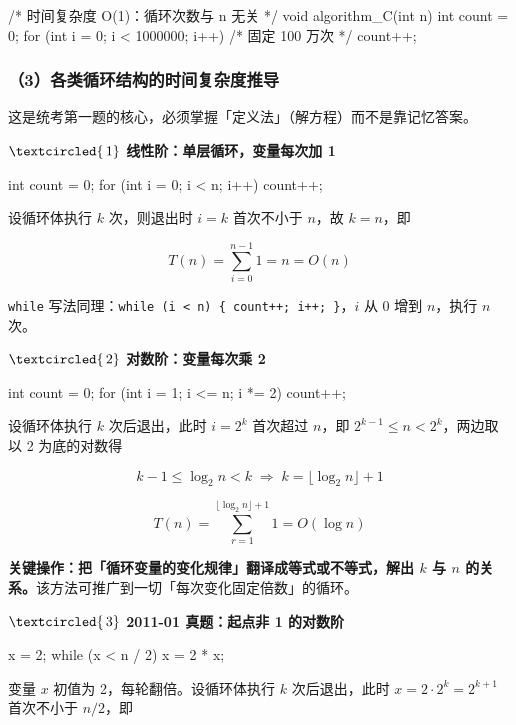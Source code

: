 \documentclass[11pt,openany,UTF8]{ctexbook}
\newcommand{\circled}[1]{\textcircled{\scriptsize\,#1}}
\begin{document}
\begin{codebox}
/* 时间复杂度 O(1)：循环次数与 n 无关 */
void algorithm_C(int n) {
    int count = 0;
    for (int i = 0; i < 1000000; i++)   /* 固定 100 万次 */
        count++;
}
\end{codebox}

\subsubsection{（3）各类循环结构的时间复杂度推导}

这是统考第一题的核心，必须掌握「定义法」（解方程）而不是靠记忆答案。

\textbf{$\circled{1}$ 线性阶：单层循环，变量每次加 1}

\begin{codebox}
int count = 0;
for (int i = 0; i < n; i++)
    count++;
\end{codebox}

设循环体执行 $k$ 次，则退出时 $i = k$ 首次不小于 $n$，故 $k = n$，即

\[T(n) = \sum_{i=0}^{n-1}1 = n = O(n)\]

\texttt{while} 写法同理：\texttt{while (i <\allowbreak{} n)\allowbreak{} \{ count+\allowbreak{}+\allowbreak{};\allowbreak{} i+\allowbreak{}+\allowbreak{};\allowbreak{} \}}，$i$ 从 0 增到 $n$，执行 $n$ 次。

\textbf{$\circled{2}$ 对数阶：变量每次乘 2}

\begin{codebox}
int count = 0;
for (int i = 1; i <= n; i *= 2)
    count++;
\end{codebox}

设循环体执行 $k$ 次后退出，此时 $i = 2^k$ 首次超过 $n$，即 $2^{k-1} \le n < 2^k$，两边取以 2 为底的对数得

\[k-1 \le \log_2 n < k \;\Longrightarrow\; k = \lfloor \log_2 n \rfloor + 1\]

\[T(n)=\sum_{r=1}^{\lfloor \log_2 n\rfloor+1} 1 = O(\log n)\]

\textbf{关键操作：把「循环变量的变化规律」翻译成等式或不等式，解出 $k$ 与 $n$ 的关系。}该方法可推广到一切「每次变化固定倍数」的循环。

\textbf{$\circled{3}$ 2011-01 真题：起点非 1 的对数阶}

\begin{codebox}
x = 2;
while (x < n / 2)
    x = 2 * x;
\end{codebox}

变量 $x$ 初值为 2，每轮翻倍。设循环体执行 $k$ 次后退出，此时 $x = 2 \cdot 2^{k} = 2^{k+1}$ 首次不小于 $n/2$，即
\end{document}
